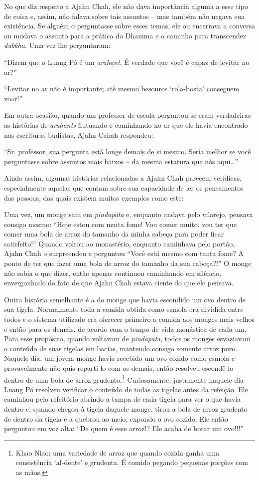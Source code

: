 No que diz respeito a Ajahn Chah, ele não dava importância alguma a esse
tipo de coisa e, assim, não falava sobre tais assuntos -- mas também não
negava sua existência. Se alguém o perguntasse sobre esses temas, ele ou
encerrava a conversa ou mudava o assunto para a prática do Dhamma e o
caminho para transcender \emph{dukkha}. Uma vez lhe perguntaram:

``Dizem que o Luang Pó é um \emph{arahant}. É verdade que você é capaz
de levitar no ar?''

``Levitar no ar não é importante; até mesmo besouros `rola-bosta'
conseguem voar!''

Em outra ocasião, quando um professor de escola perguntou se eram
verdadeiras as histórias de \emph{arahants} flutuando e caminhando no ar
que ele havia encontrado nas escrituras budistas, Ajahn Cahah respondeu:

``Sr. professor, sua pergunta está longe demais de si mesmo. Seria
melhor se você perguntasse sobre assuntos mais baixos -- da mesma
estatura que nós aqui\ldots{}''

Ainda assim, algumas histórias relacionadas a Ajahn Chah parecem
verídicas, especialmente aquelas que contam sobre sua capacidade de ler
os pensamentos das pessoas, das quais existem muitos exemplos como este:

Uma vez, um monge saiu em \emph{pindapāta} e, enquanto andava pelo
vilarejo, pensava consigo mesmo: ``Hoje estou com muita fome! Vou comer
muito, vou ter que comer uma bola de arroz do tamanho da minha cabeça
para poder ficar satisfeito!'' Quando voltou ao monastério, enquanto
caminhava pelo portão, Ajahn Chah o surpreendeu e perguntou ``Você está
mesmo com tanta fome? A ponto de ter que fazer uma bola de arroz do
tamanho da sua cabeça?!'' O monge não sabia o que dizer, então apenas
continuou caminhando em silêncio, envergonhado do fato de que Ajahn Chah
estava ciente do que ele pensava.

Outra história semelhante é a do monge que havia escondido um ovo dentro
de sua tigela. Normalmente toda a comida obtida como esmola era dividida
entre todos e o sistema utilizado era oferecer primeiro a comida aos
monges mais velhos e então para os demais, de acordo com o tempo de vida
monástica de cada um. Para esse propósito, quando voltavam de
\emph{pindapāta}, todos os monges esvaziavam o conteúdo de suas tigelas
em bacias, mantendo consigo somente arroz puro. Naquele dia, um jovem
monge havia recebido um ovo cozido como esmola e provavelmente não quis
reparti-lo com os demais, então resolveu escondê-lo dentro de uma bola
de arroz grudento.\footnote{Khao Niao: uma variedade de arroz que quando
  cozida ganha uma consistência `al-dente' e grudenta. É comido pegando
  pequenas porções com as mãos.} Curiosamente, justamente naquele dia
Luang Pó resolveu verificar o conteúdo de todas as tigelas antes da
refeição. Ele caminhou pelo refeitório abrindo a tampa de cada tigela
para ver o que havia dentro e, quando chegou à tigela daquele monge,
tirou a bola de arroz grudento de dentro da tigela e a quebrou ao meio,
expondo o ovo cozido. Ele então perguntou em voz alta: ``De quem é esse
arroz!? Ele acaba de botar um ovo!!!''

